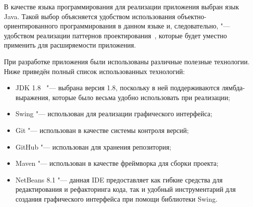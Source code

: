 В качестве языка программирования для реализации приложения выбран язык Java. Такой выбор объясняется удобством использования объектно-ориентирован\-ного программирования в данном языке и, следовательно, "--- удобством реализации паттернов проектирования~\cite{gamma}, которые будет уместно применить для расширяемости приложения.

При разработке приложения были использованы различные полезные технологии. Ниже приведён полный список использованных технологий:

\begin{itemize}
\item JDK 1.8~\cite{java} "--- выбрана версия 1.8, поскольку в ней поддерживаются лямбда-выражения, которые было весьма удобно использовать при реализации;
\item Swing "--- использован для реализации графического интерфейса;
\item Git "--- использован в качестве системы контроля версий;
\item GitHub "--- использован для хранения репозитория;
\item Maven "--- использован в качестве фреймворка для сборки проекта;
\item NetBeans 8.1 "--- данная IDE предоставляет как гибкие средства для редактирования и рефакторинга кода, так и удобный инструментарий для создания графического интерфейса при помощи библиотеки Swing.
\end{itemize}